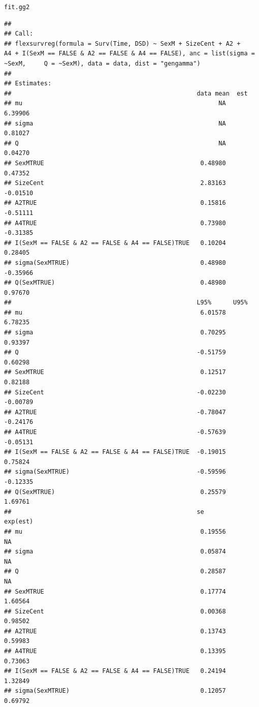 \documentclass{article}\usepackage[]{graphicx}\usepackage[]{color}
\makeatletter
\newcommand{\hlstd}[1]{\textcolor[rgb]{0.345,0.345,0.345}{#1}}%
\newenvironment{kframe}{%
 \def\at@end@of@kframe{}%
 \ifinner\ifhmode%
  \def\at@end@of@kframe{\end{minipage}}%
  \begin{minipage}{\columnwidth}%
 \fi\fi%
 \def\FrameCommand##1{\hskip\@totalleftmargin \hskip-\fboxsep
 \colorbox{shadecolor}{##1}\hskip-\fboxsep
     \hskip-\linewidth \hskip-\@totalleftmargin \hskip\columnwidth}%
 \MakeFramed {\advance\hsize-\width
   \@totalleftmargin\z@ \linewidth\hsize
   \@setminipage}}%
 {\par\unskip\endMakeFramed%
 \at@end@of@kframe}
\newenvironment{knitrout}{}{} %
\makeatother
\begin{document}
\begin{knitrout}
\begin{kframe}
\begin{alltt}
\hlstd{fit.gg2}
\end{alltt}
\begin{verbatim}
## 
## Call:
## flexsurvreg(formula = Surv(Time, DSD) ~ SexM + SizeCent + A2 +     A4 + I(SexM == FALSE & A2 == FALSE & A4 == FALSE), anc = list(sigma = ~SexM,     Q = ~SexM), data = data, dist = "gengamma")
## 
## Estimates: 
##                                                   data mean  est     
## mu                                                      NA    6.39906
## sigma                                                   NA    0.81027
## Q                                                       NA    0.04270
## SexMTRUE                                           0.48980    0.47352
## SizeCent                                           2.83163   -0.01510
## A2TRUE                                             0.15816   -0.51111
## A4TRUE                                             0.73980   -0.31385
## I(SexM == FALSE & A2 == FALSE & A4 == FALSE)TRUE   0.10204    0.28405
## sigma(SexMTRUE)                                    0.48980   -0.35966
## Q(SexMTRUE)                                        0.48980    0.97670
##                                                   L95%      U95%    
## mu                                                 6.01578   6.78235
## sigma                                              0.70295   0.93397
## Q                                                 -0.51759   0.60298
## SexMTRUE                                           0.12517   0.82188
## SizeCent                                          -0.02230  -0.00789
## A2TRUE                                            -0.78047  -0.24176
## A4TRUE                                            -0.57639  -0.05131
## I(SexM == FALSE & A2 == FALSE & A4 == FALSE)TRUE  -0.19015   0.75824
## sigma(SexMTRUE)                                   -0.59596  -0.12335
## Q(SexMTRUE)                                        0.25579   1.69761
##                                                   se        exp(est)
## mu                                                 0.19556        NA
## sigma                                              0.05874        NA
## Q                                                  0.28587        NA
## SexMTRUE                                           0.17774   1.60564
## SizeCent                                           0.00368   0.98502
## A2TRUE                                             0.13743   0.59983
## A4TRUE                                             0.13395   0.73063
## I(SexM == FALSE & A2 == FALSE & A4 == FALSE)TRUE   0.24194   1.32849
## sigma(SexMTRUE)                                    0.12057   0.69792

\end{verbatim}
\end{kframe}
\end{knitrout}
\end{document}
